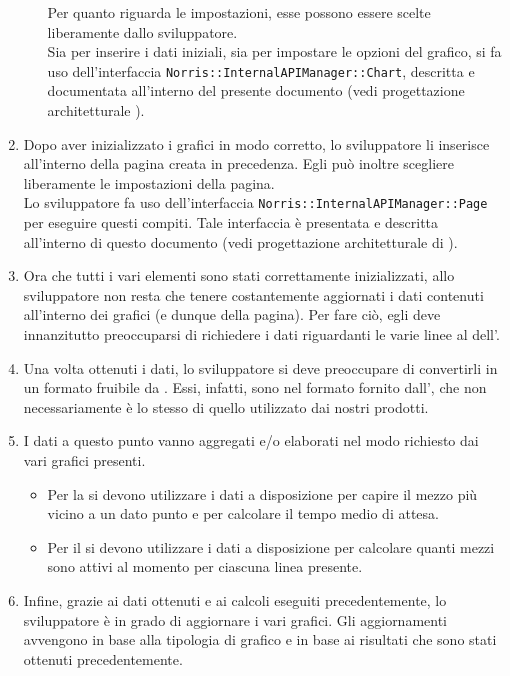 \begin{enumerate}
\begin{itemize}
                Per quanto riguarda le impostazioni, esse possono essere scelte liberamente dallo sviluppatore.\\
                Sia per inserire i dati iniziali, sia per impostare le opzioni del grafico, si fa uso dell'interfaccia \texttt{Norris::InternalAPIManager::Chart}, descritta e documentata all'interno del presente documento (vedi progettazione architetturale ).
            \end{itemize}
            \item Dopo aver inizializzato i grafici in modo corretto, lo sviluppatore li inserisce all'interno della pagina creata in precedenza. Egli può inoltre scegliere liberamente le impostazioni della pagina.\\
            Lo sviluppatore fa uso dell'interfaccia \texttt{Norris::InternalAPIManager::Page} per eseguire questi compiti. Tale interfaccia è presentata e descritta all'interno di questo documento (vedi progettazione architetturale di ).
            \item Ora che tutti i vari elementi sono stati correttamente inizializzati, allo sviluppatore non resta che tenere costantemente aggiornati i dati contenuti all'interno dei grafici (e dunque della pagina). Per fare ciò, egli deve innanzitutto preoccuparsi di richiedere i dati riguardanti le varie linee al  dell'.
            \item Una volta ottenuti i dati, lo sviluppatore si deve preoccupare di convertirli in un formato fruibile da . Essi, infatti, sono nel formato fornito dall', che non necessariamente è lo stesso di quello utilizzato dai nostri prodotti.
            \item I dati a questo punto vanno aggregati e/o elaborati nel modo richiesto dai vari grafici presenti.
            \begin{itemize}
                \item Per la  si devono utilizzare i dati a disposizione per capire il mezzo più vicino a un dato punto e per calcolare il tempo medio di attesa.
                \item Per il  si devono utilizzare i dati a disposizione per calcolare quanti mezzi sono attivi al momento per ciascuna linea presente.
            \end{itemize}
            \item Infine, grazie ai dati ottenuti e ai calcoli eseguiti precedentemente, lo sviluppatore è in grado di aggiornare i vari grafici. Gli aggiornamenti avvengono in base alla tipologia di grafico e in base ai risultati che sono stati ottenuti precedentemente.\\

\end{enumerate}
